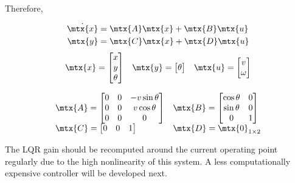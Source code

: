 Therefore,
\begin{theorem}
  \begin{align*}
    \dot{\mtx{x}} &= \mtx{A}\mtx{x} + \mtx{B}\mtx{u} \\
    \mtx{y} &= \mtx{C}\mtx{x} + \mtx{D}\mtx{u}
  \end{align*}
  \begin{equation*}
    \begin{array}{ccc}
      \mtx{x} =
      \begin{bmatrix}
        x \\
        y \\
        \theta \\
      \end{bmatrix} &
      \mtx{y} =
      \begin{bmatrix}
        \theta
      \end{bmatrix} &
      \mtx{u} =
      \begin{bmatrix}
        v \\
        \omega
      \end{bmatrix}
    \end{array}
  \end{equation*}

  \begin{equation}
    \begin{array}{ll}
      \mtx{A} =
      \begin{bmatrix}
        0 & 0 & -v\sin\theta \\
        0 & 0 & v\cos\theta \\
        0 & 0 & 0
      \end{bmatrix} &
      \mtx{B} =
      \begin{bmatrix}
        \cos\theta & 0 \\
        \sin\theta & 0 \\
        0 & 1
      \end{bmatrix} \\
      \mtx{C} =
      \begin{bmatrix}
        0 & 0 & 1
      \end{bmatrix} &
      \mtx{D} = \mtx{0}_{1 \times 2}
    \end{array}
  \end{equation}

  The LQR gain should be recomputed around the current operating point regularly
  due to the high nonlinearity of this system. A less computationally expensive
  controller will be developed next.
\end{theorem}

